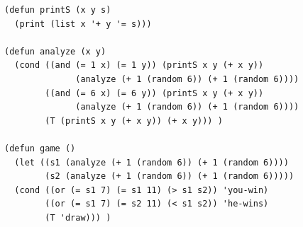 \documentclass[a4paper,14pt]{extreport} %
\begin{document}
\begin{enumerate}
\begin{lstlisting}
(defun printS (x y s)
  (print (list x '+ y '= s)))

(defun analyze (x y)
  (cond ((and (= 1 x) (= 1 y)) (printS x y (+ x y)) 
    	      (analyze (+ 1 (random 6)) (+ 1 (random 6))))
        ((and (= 6 x) (= 6 y)) (printS x y (+ x y))
    	      (analyze (+ 1 (random 6)) (+ 1 (random 6))))
        (T (printS x y (+ x y)) (+ x y))) )

(defun game ()
  (let ((s1 (analyze (+ 1 (random 6)) (+ 1 (random 6))))
        (s2 (analyze (+ 1 (random 6)) (+ 1 (random 6)))))
  (cond ((or (= s1 7) (= s1 11) (> s1 s2)) 'you-win)
        ((or (= s1 7) (= s2 11) (< s1 s2)) 'he-wins)
        (T 'draw))) )
\end{lstlisting}

\end{enumerate}
\end{document}
